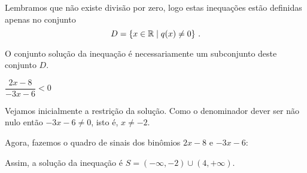  Lembramos que não existe divisão por zero, logo estas inequações estão definidas apenas no conjunto
  \[D= \{ x \in \mathbb{R} \mid  q(x) \neq 0\} \ . \]  
  
  O conjunto solução da inequação é necessariamente um subconjunto deste conjunto $D$.

\begin{exem}
    $\dfrac{2x-8}{-3x-6}<0$

    Vejamos inicialmente a restrição da solução. Como o denominador dever ser não nulo então $-3x-6\neq 0$, isto é, $x\neq -2$.

    Agora, fazemos o quadro de sinais dos binômios $2x-8$ e $-3x-6$:
    \begin{signtbl}{3}{2}
\end{signtbl}

    Assim, a solução da inequação é $S=(-\infty,-2)\cup(4,+\infty)$.
\end{exem}

